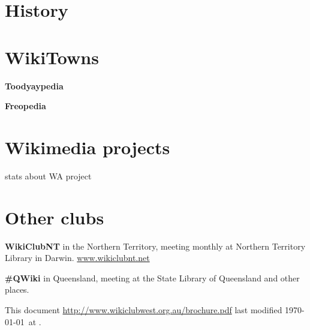 \documentclass[a4paper]{article}
\begin{document}
\begin{multicols}{3}
\section{History}



\section{WikiTowns}

\textbf{Toodyaypedia}

\textbf{Freopedia}

\section{Wikimedia projects}

stats about WA project

\section{Other clubs}

\textbf{WikiClubNT} in the Northern Territory, meeting monthly at Northern Territory Library in Darwin.
\url{www.wikiclubnt.net}

\textbf{\#QWiki} in Queensland, meeting at the State Library of Queensland and other places.

\vfill
{\tiny This document \url{http://www.wikiclubwest.org.au/brochure.pdf} last modified \today\ at \currenttime.}

\end{multicols}
\end{document}
